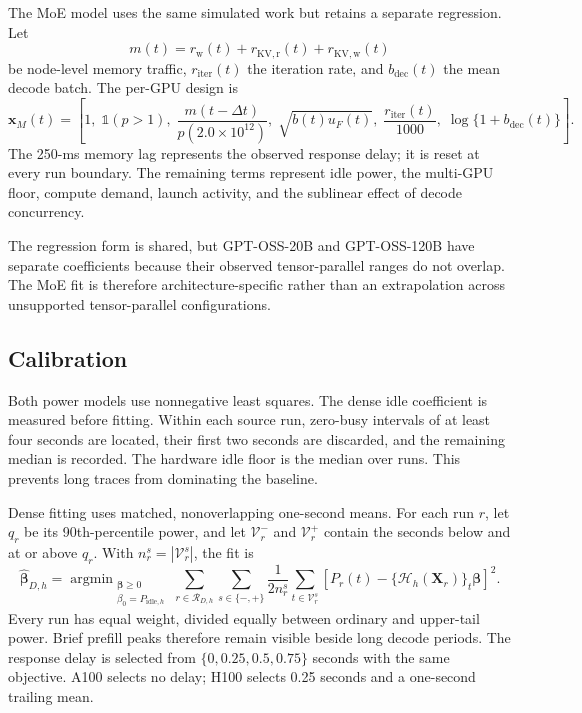 The MoE model uses the same simulated work but retains a separate regression.
Let
\begin{equation}
  m(t)=r_{\mathrm{w}}(t)+r_{\mathrm{KV,r}}(t)+r_{\mathrm{KV,w}}(t)
\end{equation}
be node-level memory traffic, $r_{\mathrm{iter}}(t)$ the iteration rate, and
$b_{\mathrm{dec}}(t)$ the mean decode batch.  The per-GPU design is
\begin{equation}
  \mathbf{x}_M(t)=\left[
    1,\;
    \mathbb{1}(p>1),\;
    \frac{m(t-\Delta t)}{p(2.0\times10^{12})},\;
    \sqrt{b(t)u_F(t)},\;
    \frac{r_{\mathrm{iter}}(t)}{1000},\;
    \log\{1+b_{\mathrm{dec}}(t)\}
  \right].
  \label{eq:moe-design}
\end{equation}
The 250-ms memory lag represents the observed response delay; it is reset at
every run boundary.  The remaining terms represent idle power, the multi-GPU
floor, compute demand, launch activity, and the sublinear effect of decode
concurrency.

The regression form is shared, but GPT-OSS-20B and GPT-OSS-120B have separate
coefficients because their observed tensor-parallel ranges do not overlap.
The MoE fit is therefore architecture-specific rather than an extrapolation
across unsupported tensor-parallel configurations.

\subsection{Calibration}
\label{sec:power-fit}

Both power models use nonnegative least squares.  The dense idle coefficient
is measured before fitting.  Within each source run, zero-busy intervals of at
least four seconds are located, their first two seconds are discarded, and
the remaining median is recorded.  The hardware idle floor is the median over
runs.  This prevents long traces from dominating the baseline.

Dense fitting uses matched, nonoverlapping one-second means.  For each run $r$,
let $q_r$ be its 90th-percentile power, and let $\mathcal V_r^-$ and
$\mathcal V_r^+$ contain the seconds below and at or above $q_r$.  With
$n_r^s=|\mathcal V_r^s|$, the fit is
\begin{equation}
  \widehat{\boldsymbol\beta}_{D,h}=
  \mathop{\arg\min}_{\substack{\boldsymbol\beta\ge0\\
    \beta_0=P_{\mathrm{idle},h}}}
  \sum_{r\in\mathcal R_{D,h}}
  \sum_{s\in\{-,+\}}\frac{1}{2n_r^s}
  \sum_{t\in\mathcal V_r^s}
  \left[P_r(t)-
  \{\mathcal H_h(\mathbf X_r)\}_t\boldsymbol\beta\right]^2.
  \label{eq:dense-objective}
\end{equation}
Every run has equal weight, divided equally between ordinary and upper-tail
power.  Brief prefill peaks therefore remain visible beside long decode
periods.  The response delay is selected from
$\{0,0.25,0.5,0.75\}$ seconds with the same objective.  A100 selects no delay;
H100 selects 0.25 seconds and a one-second trailing mean.

